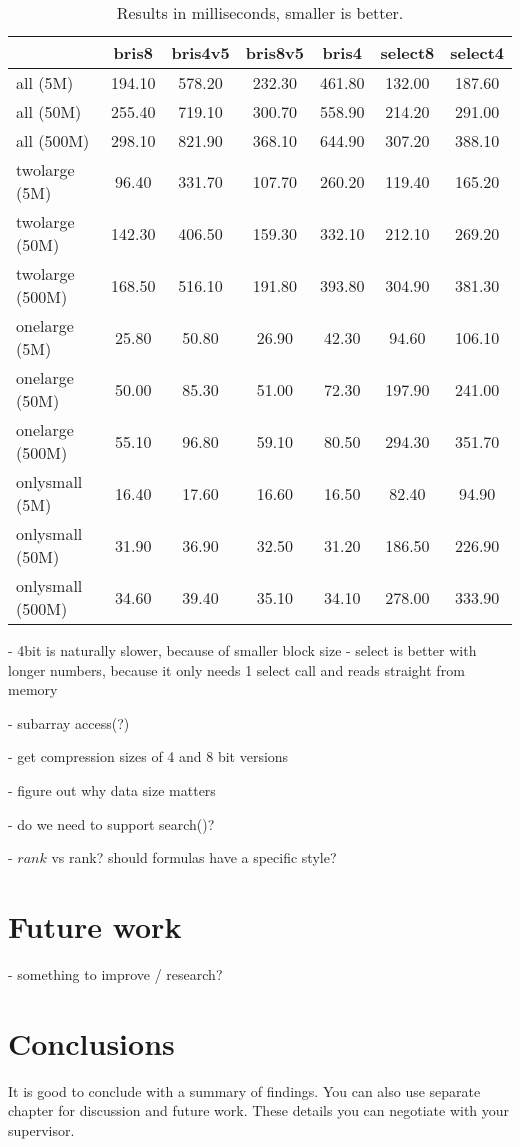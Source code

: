 \begin{table}
\centering
\caption{Results in milliseconds, smaller is better.\label{table:results1}}
\begin{tabular}{l||c c c c c c} 
& bris8 & bris4v5 & bris8v5 & bris4 & select8 & select4  \\
 \hline \hline 
all (5M)   & 194.10 & 578.20 & 232.30 & 461.80 & 132.00 & 187.60 \\
all (50M)   & 255.40 & 719.10 & 300.70 & 558.90 & 214.20 & 291.00 \\
all (500M)   & 298.10 & 821.90 & 368.10 & 644.90 & 307.20 & 388.10 \\
twolarge (5M)   & 96.40 & 331.70 & 107.70 & 260.20 & 119.40 & 165.20 \\
twolarge (50M)   & 142.30 & 406.50 & 159.30 & 332.10 & 212.10 & 269.20 \\
twolarge (500M)   & 168.50 & 516.10 & 191.80 & 393.80 & 304.90 & 381.30 \\
onelarge (5M)   & 25.80 & 50.80 & 26.90 & 42.30 & 94.60 & 106.10 \\
onelarge (50M)   & 50.00 & 85.30 & 51.00 & 72.30 & 197.90 & 241.00 \\
onelarge (500M)   & 55.10 & 96.80 & 59.10 & 80.50 & 294.30 & 351.70 \\
onlysmall (5M)   & 16.40 & 17.60 & 16.60 & 16.50 & 82.40 & 94.90 \\
onlysmall (50M)   & 31.90 & 36.90 & 32.50 & 31.20 & 186.50 & 226.90 \\
onlysmall (500M)   & 34.60 & 39.40 & 35.10 & 34.10 & 278.00 & 333.90 \\


\hline
%
\end{tabular}
\end{table}

 - 4bit is naturally slower, because of smaller block size
 - select is better with longer numbers, because it only needs 1 select call and reads straight from memory
 

 - subarray access(?)

 - get compression sizes of 4 and 8 bit versions

 - figure out why data size matters

 - do we need to support search()?

 - $rank$ vs rank? should formulas have a specific style?

\chapter{Future work}
 - something to improve / research?

\chapter{Conclusions\label{chapter:conclusions}}

It is good to conclude with a summary of findings. You can also use separate chapter for discussion and future work. These details you can negotiate with your supervisor.

